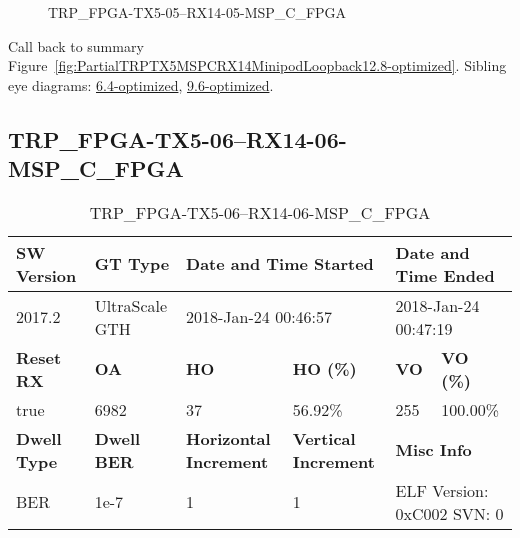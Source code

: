 \begin{figure}[h]
\caption{TRP\_FPGA-TX5-05--RX14-05-MSP\_C\_FPGA} \label{fig:TRPFPGATX505RX1405MSPCFPGA12.8-optimized}
\end{figure}

Call back to summary Figure~\ref{fig:PartialTRPTX5MSPCRX14MinipodLoopback12.8-optimized}.
Sibling eye diagrams: \hyperref[sec:TRPFPGATX505RX1405MSPCFPGA6.4-optimized]{6.4-optimized}, \hyperref[sec:TRPFPGATX505RX1405MSPCFPGA9.6-optimized]{9.6-optimized}.

\clearpage
\newpage


\subsection{TRP\_FPGA-TX5-06--RX14-06-MSP\_C\_FPGA}\label{sec:TRPFPGATX506RX1406MSPCFPGA12.8-optimized}

\begin{table}[h]
\centering
\caption{TRP\_FPGA-TX5-06--RX14-06-MSP\_C\_FPGA}
\label{tab:TRPFPGATX506RX1406MSPCFPGA12.8-optimized}
\begin{tabular}{@{}|l|l|l|l|l|l|@{}}
\toprule
\textbf{SW Version}                & \textbf{GT Type}   & \multicolumn{2}{l|}{\textbf{Date and Time Started}}            & \multicolumn{2}{l|}{\textbf{Date and Time Ended}}        \\ \midrule
2017.2                       & UltraScale GTH          & \multicolumn{2}{l|}{2018-Jan-24 00:46:57}                   & \multicolumn{2}{l|}{2018-Jan-24 00:47:19}               \\ \midrule
\textbf{Reset RX}                  & \textbf{OA} & \textbf{HO}   & \textbf{HO (\%)} & \textbf{VO} & \textbf{VO (\%)} \\ \midrule
true & 6982        & 37          & 56.92\%        & 255        & 100.00\%       \\ \midrule
\textbf{Dwell Type}                & \textbf{Dwell BER} & \textbf{Horizontal Increment} & \textbf{Vertical Increment}    & \multicolumn{2}{l|}{\textbf{Misc Info}}                  \\ \midrule
BER                            & 1e-7        & 1        & 1           & \multicolumn{2}{l|}{ELF Version: 0xC002 SVN: 0}                         \\ \bottomrule
\end{tabular}
\end{table}

